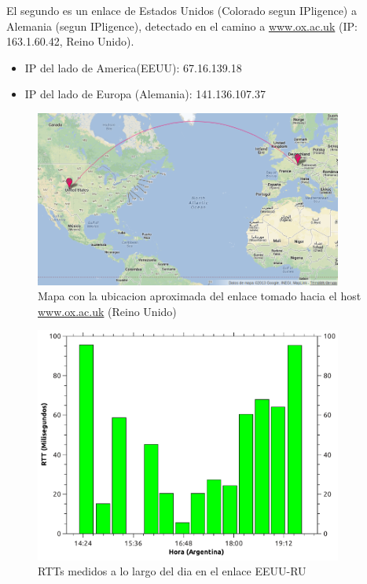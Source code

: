 El segundo es un enlace de Estados Unidos (Colorado segun IPligence) a Alemania (segun IPligence), detectado en el camino a \url{www.ox.ac.uk} (IP: 163.1.60.42, Reino Unido).

\begin{itemize}
 \item IP del lado de America(EEUU): 67.16.139.18
 \item IP del lado de Europa (Alemania): 141.136.107.37\\
\end{itemize}


\begin{figure}[H]
  \centering
    \includegraphics[width=0.9\textwidth]{imgs/inglaterra_enlace_1.png}
    \caption{Mapa con la ubicacion aproximada del enlace tomado hacia el host \url{www.ox.ac.uk} (Reino Unido)}
    \label{fig:mapa_ing}
\end{figure}


\begin{figure}[H]
  \centering
    \includegraphics[width=0.9\textwidth]{graficos/rtts_dia_finlandia.pdf}
    \caption{RTTs medidos a lo largo del dia en el enlace EEUU-RU}
    \label{fig:rtts_fin}
\end{figure}

